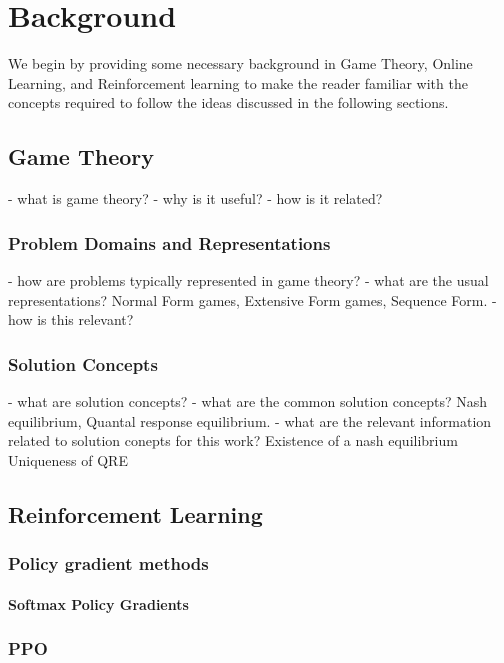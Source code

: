 \chapter{Background}

We begin by providing some necessary background in Game Theory, Online Learning, and Reinforcement
learning to make the reader familiar with the concepts required to follow the ideas discussed in
the following sections.

\section{Game Theory}
- what is game theory?
- why is it useful?
- how is it related?

\subsection{Problem Domains and Representations}
- how are problems typically represented in game theory?
- what are the usual representations?
Normal Form games, Extensive Form games, Sequence Form.
- how is this relevant?

\subsection{Solution Concepts}
- what are solution concepts?
- what are the common solution concepts?
Nash equilibrium, Quantal response equilibrium.
- what are the relevant information related to solution conepts for this work?
Existence of a nash equilibrium Uniqueness of QRE

\section{Reinforcement
  Learning}

\subsection{Policy gradient methods}

\subsubsection{Softmax Policy Gradients}\label{sec:spg}

\subsection{PPO}


